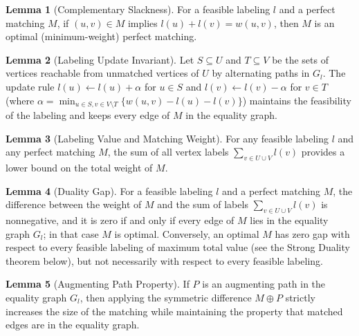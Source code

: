 \documentclass{article}
\theoremstyle{definition}
\newtheorem{lemma}{Lemma}
\begin{document}
\begin{lemma}[Complementary Slackness]
For a feasible labeling $l$ and a perfect matching $M$, if $(u,v) \in M$ implies $l(u) + l(v) = w(u,v)$, then $M$ is an optimal (minimum-weight) perfect matching.
\end{lemma}

\begin{lemma}[Labeling Update Invariant]
Let $S \subseteq U$ and $T \subseteq V$ be the sets of vertices reachable from unmatched vertices of $U$ by alternating paths in $G_l$. The update rule $l(u) \gets l(u) + \alpha$ for $u \in S$ and $l(v) \gets l(v) - \alpha$ for $v \in T$ (where $\alpha = \min_{u \in S, v \in V \setminus T} \{w(u,v) - l(u) - l(v)\}$) maintains the feasibility of the labeling and keeps every edge of $M$ in the equality graph.
\end{lemma}

\begin{lemma}[Labeling Value and Matching Weight]
For any feasible labeling $l$ and any perfect matching $M$, the sum of all vertex labels $\sum_{v \in U \cup V} l(v)$ provides a lower bound on the total weight of $M$.
\end{lemma}

\begin{lemma}[Duality Gap]
For a feasible labeling $l$ and a perfect matching $M$, the difference between the weight of $M$ and the sum of labels $\sum_{v \in U \cup V} l(v)$ is nonnegative, and it is zero if and only if every edge of $M$ lies in the equality graph $G_l$; in that case $M$ is optimal. Conversely, an optimal $M$ has zero gap with respect to every feasible labeling of maximum total value (see the Strong Duality theorem below), but not necessarily with respect to every feasible labeling.
\end{lemma}


\begin{lemma}[Augmenting Path Property]
If $P$ is an augmenting path in the equality graph $G_l$, then applying the symmetric difference $M \oplus P$ strictly increases the size of the matching while maintaining the property that matched edges are in the equality graph.
\end{lemma}
\end{document}
